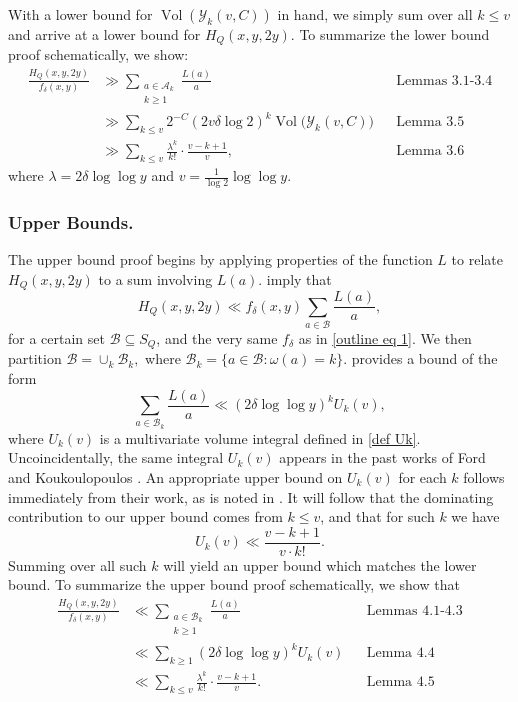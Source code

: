 \documentclass{amsart}
\theoremstyle{definition}
\numberwithin{equation}{section}
\newcommand{\density}{\delta}
\DeclareMathOperator{\Vol}{Vol}
\begin{document}
		
		With a lower bound for $\Vol(\mathcal{Y}_k(v,C))$ in hand, we simply sum over all $k \leq v$ and arrive at a lower bound for $H_Q(x,y,2y)$. To summarize the lower bound proof schematically, we show:
		\begin{align*}
			\frac{H_Q(x,y,2y)}{f_\density(x,y)} &\gg \sum_{\substack{a \in \mathscr{A}_k \\ k \geq 1}}\frac{L(a)}{a} && \text{Lemmas 3.1-3.4}\\ &\gg \sum_{k \leq v} 2^{-C} (2 v \delta \log 2)^k \Vol\big(\mathcal{Y}_k(v,C)\big) && \text{Lemma 3.5}\\ &\gg \sum_{k \leq v}\frac{\lambda^k}{k!}\cdot\frac{v-k+1}{v},&& \text{Lemma 3.6}
		\end{align*}
		where $\lambda = 2 \density \log \log y$ and $v = \frac{1}{\log 2}\log \log y$.
		
		\subsubsection*{Upper Bounds.}The upper bound proof begins by applying properties of the function \(L\) to relate \(H_Q(x,y,2y)\) to a sum involving \(L(a)\).  imply that 
		$$H_Q(x,y,2y) \ll {f}_\density(x,y)\sum_{a \in \mathscr{B}}\frac{L(a)}{a},$$
		for a certain set $\mathscr{B} \subseteq S_Q$, and the very same $f_\delta$ as in \eqref{outline eq 1}. We then partition $\mathscr{B} = \cup_k \mathscr{B}_k,$ where $\mathscr{B}_k = \{a \in \mathscr{B}: \omega(a) = k\}$.  provides a bound of the form
		$$\sum_{a \in \mathscr{B}_k}\frac{L(a)}{a} \ll (2 \delta \log \log y)^k U_k(v),$$
		where $U_k(v)$ is a multivariate volume integral defined in \eqref{def Uk}. Uncoincidentally, the same integral $U_k(v)$ appears in the past works of Ford \cite{ford2006integers} and Koukoulopoulos \cite{koukoulopoulos2010generalized}. An appropriate upper bound on $U_k(v)$ for each $k$ follows immediately from their work, as is noted in . It will follow that the dominating contribution to our upper bound comes from $k \leq v$, and that for such $k$ we have
		$$U_k(v) \ll \frac{v-k+1}{v \cdot k!}.$$
		Summing over all such $k$ will yield an upper bound which matches the lower bound. To summarize the upper bound proof schematically, we show that
		\begin{align*}
			\frac{H_Q(x,y,2y)}{f_\density (x,y)} &\ll \sum_{\substack{a \in \mathscr{B}_k \\ k \geq 1}} \frac{L(a)}{a} &&\text{Lemmas 4.1-4.3}\\ &\ll \sum_{k \geq 1} (2 \delta \log \log y)^k U_k(v) && \text{Lemma 4.4}\\ &\ll \sum_{k \leq v}\frac{\lambda^k}{k!}\cdot\frac{v-k+1}{v}. && \text{Lemma 4.5}
		\end{align*}
	
\end{document}
